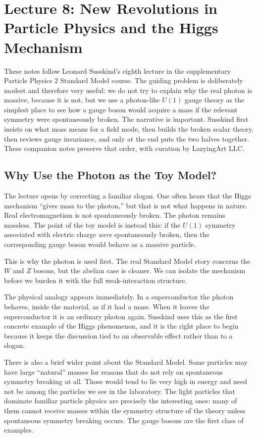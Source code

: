 \chapter{Lecture 8: New Revolutions in Particle Physics and the Higgs Mechanism}

These notes follow Leonard Susskind's eighth lecture in the supplementary Particle Physics 2 Standard Model course. The guiding problem is deliberately modest and therefore very useful: we do not try to explain why the real photon is massive, because it is not, but we use a photon-like \(U(1)\) gauge theory as the simplest place to see how a gauge boson would acquire a mass if the relevant symmetry were spontaneously broken. The narrative is important. Susskind first insists on what mass means for a field mode, then builds the broken scalar theory, then reviews gauge invariance, and only at the end puts the two halves together. These companion notes preserve that order, with curation by LazyingArt LLC.

\section{Why Use the Photon as the Toy Model?}

The lecture opens by correcting a familiar slogan. One often hears that the Higgs mechanism ``gives mass to the photon,'' but that is not what happens in nature. Real electromagnetism is not spontaneously broken. The photon remains massless. The point of the toy model is instead this: if the \(U(1)\) symmetry associated with electric charge \emph{were} spontaneously broken, then the corresponding gauge boson would behave as a massive particle.

This is why the photon is used first. The real Standard Model story concerns the \(W\) and \(Z\) bosons, but the abelian case is cleaner. We can isolate the mechanism before we burden it with the full weak-interaction structure.

The physical analogy appears immediately. In a superconductor the photon behaves, inside the material, as if it had a mass. When it leaves the superconductor it is an ordinary photon again. Susskind uses this as the first concrete example of the Higgs phenomenon, and it is the right place to begin because it keeps the discussion tied to an observable effect rather than to a slogan.

There is also a brief wider point about the Standard Model. Some particles may have large ``natural'' masses for reasons that do not rely on spontaneous symmetry breaking at all. Those would tend to lie very high in energy and need not be among the particles we see in the laboratory. The light particles that dominate familiar particle physics are precisely the interesting ones: many of them cannot receive masses within the symmetry structure of the theory unless spontaneous symmetry breaking occurs. The gauge bosons are the first class of examples.

